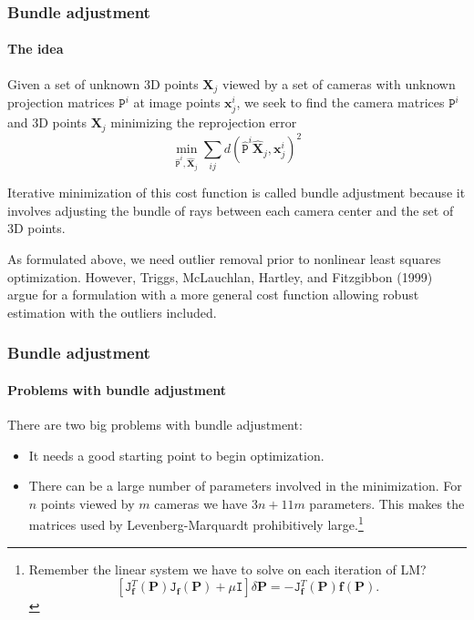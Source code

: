 \documentclass[aspectratio=169]{beamer}
\renewcommand{\vec}[1]{\boldsymbol{#1}}
\newcommand{\mat}[1]{\mathtt{#1}}
\begin{document}
\begin{frame}
\frametitle{Bundle adjustment}
\framesubtitle{The idea}

Given a set of unknown 3D points $\vec{X}_j$ viewed by a set of
cameras with unknown projection matrices $\mat{P}^i$ at image points
$\vec{x}_j^i$, we seek to find the camera matrices $\mat{P}^i$ and 3D
points $\vec{X}_j$ minimizing the reprojection error
\begin{equation*}
\min_{\hat{\mat{P}}^i,\hat{\vec{X}}_j} \sum_{ij} 
d(\hat{\mat{P}}^i\hat{\vec{X}}_j,\vec{x}^i_j)^2
\end{equation*}

\medskip

Iterative minimization of this cost function is called \alert{bundle
adjustment} because it involves adjusting the bundle of rays between
each camera center and the set of 3D points.

\medskip

As formulated above, we need outlier removal prior to nonlinear least
squares optimization. However, Triggs, McLauchlan, Hartley, and
Fitzgibbon (1999) argue for a formulation with a more general cost
function allowing robust estimation with the outliers included.

\end{frame}


\begin{frame}
\frametitle{Bundle adjustment}
\framesubtitle{Problems with bundle adjustment}

There are two big \alert{problems} with bundle adjustment:
\begin{itemize}
\item It needs a good \alert{starting point} to begin optimization.
\item There can be a \alert{large number of parameters} involved in
  the minimization.  For $n$ points viewed by $m$ cameras we have
  $3n+11m$ parameters.  This makes the matrices used by
  Levenberg-Marquardt prohibitively large.\footnote{Remember the
      linear system we have to solve on each iteration of LM?
\begin{equation*}
      \left[ \mat{J}_{\vec{f}}^T(\vec{P})\mat{J}_{\vec{f}}(\vec{P}) +
          \mu\mat{I} \right] \delta{\vec{P}} =
          -\mat{J}^T_{\vec{f}}(\vec{P})\vec{f}(\vec{P}).
\end{equation*}}

\end{itemize}

\end{frame}
\end{document}
